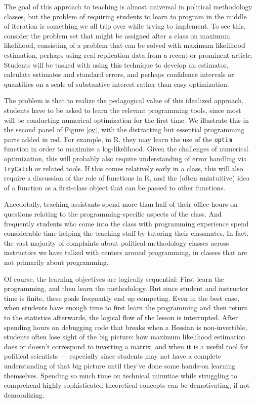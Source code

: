 \documentclass[12pt]{article}
\theoremstyle{definition}
\begin{document}
The goal of this approach to teaching is almost universal in political methodology classes, but the problem of requiring students to learn to program in the middle of iteration is something we all trip over while trying to implement.  To see this, consider the problem set that might be assigned after a class on maximum likelihood, consisting of a problem that can be solved with maximum likelihood estimation, perhaps using real replication data from a recent or prominent article. Students will be tasked with using this technique to develop an estimator, calculate estimates and standard errors, and perhaps confidence intervals or quantities on a scale of substantive interest rather than easy optimization.

The problem is that to realize the pedagogical value of this idealized approach, students have to be asked to learn the relevant programming tools, since most will be conducting numerical optimization for the first time.  We illustrate this in the second panel of Figure \ref{ov}, with the distracting but essential programming parts added in red. For example, in R, they may learn the use of the \verb|optim| function in order to maximize a log-likelihood. Given the challenges of numerical optimization, this will probably also require understanding of error handling via \verb|tryCatch| or related tools. If this comes relatively early in a class, this will also require a discussion of the role of functions in R, and the (often unintuitive) idea of a function as a first-class object that can be passed to other functions. 

Anecdotally, teaching assistants spend more than half of their office-hours on questions relating to the programming-specific aspects of the class. And frequently students who come into the class with programming experience spend considerable time helping the teaching staff by tutoring their classmates. In fact, the vast majority of complaints about political methodology classes across instructors we have talked with centers around programming, in classes that are not primarily about programming.

Of course, the learning objectives are logically sequential: First learn the programming, and then learn the methodology. But since student and instructor time is finite, these goals frequently end up competing. Even in the best case, when students have enough time to first learn the programming and then return to the statistics afterwards, the logical flow of the lesson is interrupted. After spending hours on debugging code that breaks when a Hessian is non-invertible, students often lose sight of the big picture: how maximum likelihood estimation does or doesn't correspond to inverting a matrix, and when it is a useful tool for political scientists --- especially since students may not have a complete understanding of that big picture until they've done some hands-on learning themselves. Spending so much time on technical minutiae while struggling to comprehend highly sophisticated theoretical concepts can be demotivating, if not demoralizing.
\end{document}
